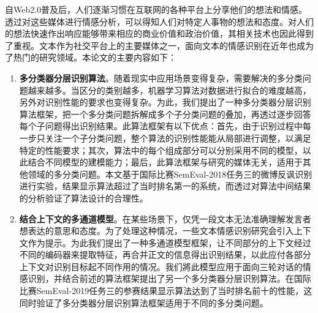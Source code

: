\begin{cabstract}

自Web2.0普及后，人们逐渐习惯在互联网的各种平台上分享他们的想法和情感。透过对这些媒体进行情感分析，可以得知人们对特定人事物的想法和态度。对人们的想法快速作出响应能够带来相应的商业价值和政治价值，其相关技术也因此得到了重视。文本作为社交平台上的主要媒体之一，面向文本的情感识别在近年也成为了热门的研究领域。本论文的主要内容如下：

\begin{enumerate}

\item {\bf 多分类器分层识别算法}。随着现实中应用场景变得复杂，需要解决的多分类问题越来越多。当区分的类别越多，机器学习算法对数据进行拟合的难度越高，另外对识别性能的要求也变得复杂。为此，我们提出了一种多分类器分层识别算法框架，把一个多分类问题拆解成多个子分类问题的叠加，再透过逐步回答每个子问题得出识别结果。此算法框架有以下优点：首先，由于识别过程中每一步只关注一个子分类问题，整个算法的识别性能能从局部进行调整，以满足特定的性能要求；其次，算法中的每个组成部分可以分别采用不同的模型，以此结合不同模型的建模能力；最后，此算法框架与研究的媒体无关，适用于其他领域的多分类问题。本文基于国际比赛SemEval-2018任务三的微博反讽识别进行实验，结果显示算法超过了当时排名第一的系统，而透过对算法中间结果的分析验证了算法设计的合理性。

\item {\bf 结合上下文的多通道模型}。在某些场景下，仅凭一段文本无法准确理解发言者想表达的意思和态度。为了处理这种情况，一些文本情感识别研究会引入上下文作为提示。为此我们提出了一种多通道模型框架，让不同部分的上下文经过不同的编码器来提取特征，再合并正文的信息得出识别结果，以此应付各部分上下文对识别目标起不同作用的情况。我们將此模型应用于面向三轮对话的情感识别，并结合前述的算法框架提出了另一个多分类器分层识别算法。在国际比赛SemEval-2019任务三的参赛结果显示算法达到了当时排名前十的性能，这同时验证了多分类器分层识别算法框架适用于不同的多分类问题。

\end{enumerate}


\end{cabstract}


